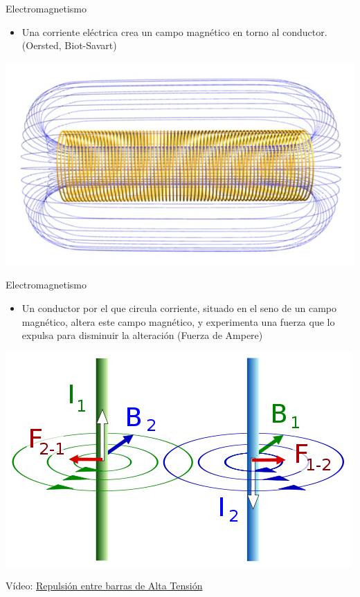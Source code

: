\documentclass[xcolor={usenames,svgnames,dvipsnames}]{beamer}
\begin{document}
\begin{frame}[label={sec:org98bc87c}]{Electromagnetismo}
\begin{itemize}
\item Una corriente eléctrica crea un campo magnético en torno al
conductor. (Oersted, Biot-Savart)
\end{itemize}

\begin{center}
\includegraphics[width=.9\linewidth]{../figs/Solenoide.jpg}
\end{center}
\end{frame}

\begin{frame}[label={sec:org2a262fe}]{Electromagnetismo}
\begin{itemize}
\item Un conductor por el que circula corriente, situado en el seno de un
campo magnético, altera este campo magnético, y experimenta una
fuerza que lo expulsa para disminuir la alteración (Fuerza de Ampere)
\end{itemize}

\begin{center}
\includegraphics[width=.9\linewidth]{../figs/FuerzasRepulsion.png}
\end{center}

\begin{center}
Vídeo: \href{http://www.youtube.com/watch?v=2j8D\_N1v0tU}{Repulsión entre barras de Alta Tensión}
\end{center}
\end{frame}
\end{document}
